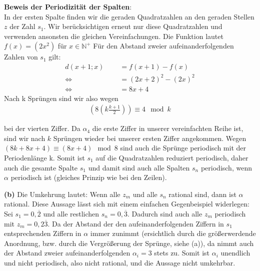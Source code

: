 \documentclass[11pt,a4paper,oneside,]{article}
\begin{document}
{\bf Beweis der Periodizität der Spalten}:\\
In der ersten Spalte finden wir die geraden Quadratzahlen an den geraden Stellen $z$ der Zahl $s_1$. Wir berücksichtigen erneut nur diese Quadratzahlen und verwenden ansonsten die gleichen Vereinfachungen. Die Funktion lautet $f(x)=(2x^2)$ für $x\in \mathbb{N}^+$ Für den Abstand zweier aufeinanderfolgenden Zahlen von $s_1$ gilt: 
\begin{align*}
    d(x+1;x)\:&= f(x+1)-f(x)\\
    \Leftrightarrow \qquad \qquad\qquad&= (2x+2)^2-(2x)^2\\
    \Leftrightarrow \qquad\qquad\qquad&= 8x+4 
\end{align*}
Nach k Sprüngen sind wir also wegen
\begin{align*}
    \left(8\left(k\frac{k+1}{2}\right)\right) \equiv 4 \mod{k} 
\end{align*}
    
bei der vierten Ziffer. Da $\alpha_4$ die erste Ziffer in unserer vereinfachten Reihe ist, sind wir nach $k$ Sprüngen wieder bei unserer ersten Ziffer angekommen. Wegen $(8k + 8x+ 4) \equiv (8x + 4) \mod{8}$ sind auch die Sprünge periodisch mit der Periodenlänge k. Somit ist $s_1$ auf die Quadratzahlen reduziert periodisch, daher auch die gesamte Spalte $s_1$ und damit sind auch alle Spalten $s_n$ periodisch, wenn $\alpha$ periodisch ist (gleiches Prinzip wie bei den Zeilen).

{\bf (b)}
Die Umkehrung lautet: Wenn alle $z_m$ und alle $s_n$ rational sind, dann ist $\alpha$ rational. Diese Aussage lässt sich mit einem einfachen Gegenbeispiel widerlegen:\\
Sei $s_1 = 0,\overline{2}$ und alle restlichen $s_n = 0,\overline{3}.$ Dadurch sind auch alle $z_m$ periodisch mit $z_m = 0,2\overline{3}$. Da der Abstand der den aufeinanderfolgenden Ziffern in $s_1$  entsprechenden Ziffern in $\alpha$ immer zunimmt (ersichtlich durch die größerwerdende Anordnung, bzw. durch die Vergrößerung der Sprünge, siehe (a)), da nimmt auch der Abstand zweier aufeinanderfolgenden $\alpha_i = 3$ stets zu. Somit ist $\alpha_i$ unendlich und nicht periodisch, also nicht rational, und die Aussage nicht umkehrbar. 
\end{document}
